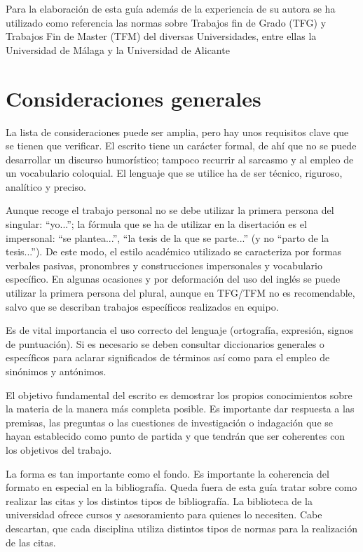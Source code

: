 Para la elaboración de esta guía además de la experiencia de su autora se ha utilizado como referencia las normas sobre Trabajos fin de Grado (TFG) y Trabajos Fin de Master (TFM) del diversas Universidades, entre ellas la Universidad de Málaga \cite{malaga} y la Universidad de Alicante \cite{alicante}


\chapter{Consideraciones generales} 
\label{sec:consideraciones}


La lista de consideraciones puede ser amplia, pero hay unos requisitos clave que se tienen que verificar.
El  escrito  tiene  un  carácter  formal,  de  ahí  que  no  se  puede  desarrollar  un  discurso  humorístico;  tampoco  recurrir  al  sarcasmo  y  al  empleo  de  un  vocabulario  coloquial.  El  lenguaje que se utilice ha de ser técnico, riguroso, analítico y preciso. 

Aunque recoge el trabajo personal no se debe utilizar la  primera  persona  del  singular:  “yo...”; la fórmula que se ha de utilizar en la disertación es el impersonal: “se plantea...”, “la  tesis  de  la  que  se  parte...”  (y  no  “parto  de  la  tesis...”).  De  este  modo,  el  estilo  académico   utilizado   se   caracteriza   por   formas   verbales   pasivas,   pronombres   y   construcciones impersonales y vocabulario específico. En algunas ocasiones y por deformación del uso del inglés se puede utilizar la primera persona del plural, aunque en TFG/TFM no es recomendable, salvo que se describan trabajos específicos realizados en equipo.

Es de vital importancia el uso correcto del lenguaje (ortografía, expresión, signos de puntuación).  Si es necesario se deben consultar diccionarios generales o específicos para aclarar significados de términos así como para el empleo de sinónimos y antónimos. 

El  objetivo  fundamental  del  escrito  es  demostrar  los  propios  conocimientos  sobre  la  materia de la manera más completa posible. Es importante dar respuesta  a las  premisas,  las  preguntas  o  las  cuestiones  de  investigación  o  indagación  que  se  hayan  establecido como punto de partida y que tendrán que ser coherentes con los objetivos del trabajo.

La forma es tan importante como el fondo. Es importante la coherencia del formato en especial en la bibliografía. Queda fuera de esta guía tratar sobre como realizar las citas y los distintos tipos de bibliografía. La biblioteca de la universidad ofrece cursos y asesoramiento para quienes lo necesiten. Cabe descartan, que cada disciplina utiliza distintos tipos de normas para la realización de las citas.

